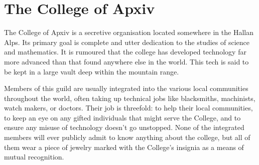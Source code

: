 \section{The College of Apxiv}
The College of Apxiv is a secretive organisation located somewhere in the Hallan Alps.
Its primary goal is complete and utter dedication to the studies of science and mathematics.
It is rumoured that the college has developed technology far more advanced than that found anywhere else in the world.
This tech is said to be kept in a large vault deep within the mountain range.

Members of this guild are usually integrated into the various local communities throughout the world, often taking up technical jobs like blacksmiths, machinists, watch makers, or doctors.
Their job is threefold: to help their local communities, to keep an eye on any gifted individuals that might serve the College, and to ensure any misuse of technology doesn't go unstopped.
None of the integrated members will ever publicly admit to know anything about the college, but all of them wear a piece of jewelry marked with the College's insignia as a means of mutual recognition.